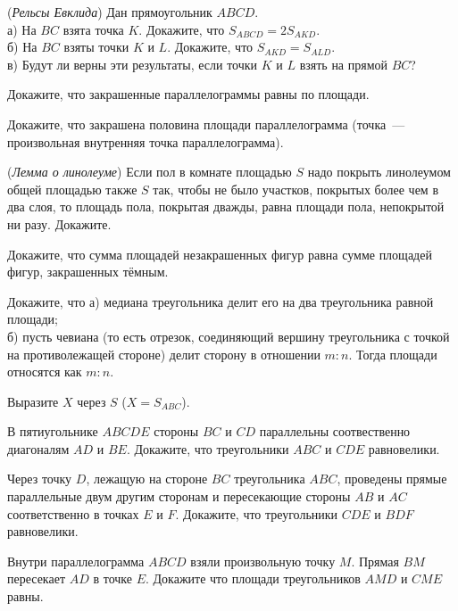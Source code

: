 \begin{problems}

\item (\textit{Рельсы Евклида})
Дан прямоугольник $ABCD$. \\
а) На $BC$ взята точка $K$. Докажите, что $S_{ABCD} = 2 S_{AKD}$.\\
б) На $BC$ взяты точки $K$ и $L$. Докажите, что $S_{AKD} = S_{ALD}$. \\
в) Будут ли верны эти результаты, если точки $K$ и $L$ взять на прямой $BC$? \\ 
\item
Докажите, что закрашенные параллелограммы равны по площади.

\item
Докажите, что закрашена половина площади параллелограмма (точка~--- произвольная внутренняя точка параллелограмма). 

\item (\textit{Лемма о линолеуме}) Если пол в комнате площадью $S$ надо покрыть линолеумом общей площадью также $S$ так, чтобы не было участков, покрытых более чем в два слоя, то площадь пола, покрытая дважды, равна площади пола, непокрытой ни разу. Докажите.


\item
Докажите, что сумма площадей незакрашенных фигур равна сумме площадей фигур, закрашенных тёмным.


\item
Докажите, что а) медиана треугольника делит его на два треугольника равной площади;\\
б) пусть чевиана (то есть отрезок, соединяющий вершину треугольника с точкой на противолежащей стороне) делит сторону в отношении $m:n$. Тогда площади относятся как $m:n$. 

\item
Выразите $X$ через $S$ ($X = S_{ABC}$). \\
\item
В пятиугольнике $ABCDE$ стороны $BC$ и $CD$ параллельны соотвественно диагоналям $AD$ и $BE$. Докажите, что треугольники $ABC$ и $CDE$ равновелики.

\item
Через точку $D$, лежащую на стороне $BC$ треугольника $ABC$, проведены прямые параллельные двум другим сторонам и пересекающие стороны $AB$ и $AC$ соответственно в точках $E$ и $F$. Докажите, что треугольники $CDE$ и $BDF$ равновелики.

\item
Внутри параллелограмма $ABCD$ взяли произвольную точку $M$. Прямая $BM$ пересекает $AD$ в точке $E$. Докажите что площади треугольников $AMD$ и $CME$ равны.


\end{problems}
